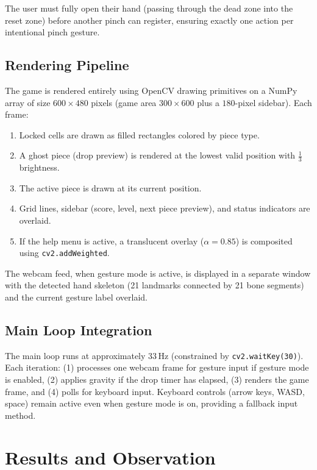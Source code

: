 \documentclass[conference]{IEEEtran}
\begin{document}
The user must fully open their hand (passing through the dead zone into the reset zone) before another pinch can register, ensuring exactly one action per intentional pinch gesture.

\subsection{Rendering Pipeline}

The game is rendered entirely using OpenCV drawing primitives on a NumPy array of size $600 \times 480$ pixels (game area $300 \times 600$ plus a $180$-pixel sidebar). Each frame:

\begin{enumerate}
    \item Locked cells are drawn as filled rectangles colored by piece type.
    \item A ghost piece (drop preview) is rendered at the lowest valid position with $\frac{1}{3}$ brightness.
    \item The active piece is drawn at its current position.
    \item Grid lines, sidebar (score, level, next piece preview), and status indicators are overlaid.
    \item If the help menu is active, a translucent overlay ($\alpha = 0.85$) is composited using \texttt{cv2.addWeighted}.
\end{enumerate}

The webcam feed, when gesture mode is active, is displayed in a separate window with the detected hand skeleton (21 landmarks connected by 21 bone segments) and the current gesture label overlaid.

\subsection{Main Loop Integration}

The main loop runs at approximately 33\,Hz (constrained by \texttt{cv2.waitKey(30)}). Each iteration: (1) processes one webcam frame for gesture input if gesture mode is enabled, (2) applies gravity if the drop timer has elapsed, (3) renders the game frame, and (4) polls for keyboard input. Keyboard controls (arrow keys, WASD, space) remain active even when gesture mode is on, providing a fallback input method.

\section{Results and Observation}
\end{document}
